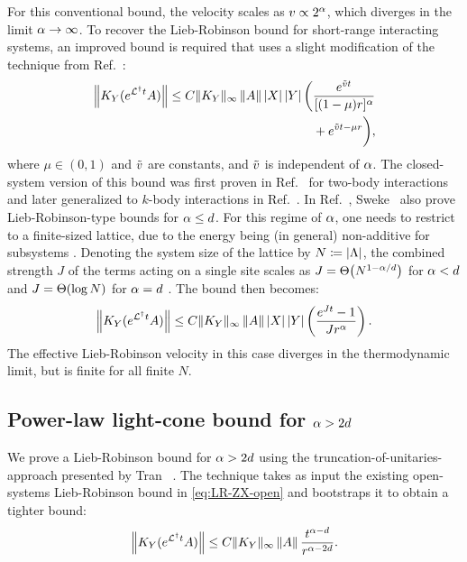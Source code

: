 For this conventional bound, the velocity scales as $v\propto 2^{\alpha} $, which diverges in the limit $\alpha \rightarrow \infty$.
To recover the Lieb-Robinson bound for short-range interacting systems, an improved bound is required that uses a slight modification of the technique from Ref.~\cite{Sweke2019}:
\begin{align}
  \begin{split}
  \left\|  K_Y(e^{\mathcal{L}^\dag t}A)\right\| \leq C \|K_Y\|_{\infty} \left\|A\right\|  \left | X \right|\left | Y \right|
    \biggl(&
    \frac{e^{\tilde vt}}{[(1-\mu)r]^{\alpha}}\\
    &+e^{\tilde vt-\mu r}
    \biggr),
  \end{split}\label{eq:LR-ZX-open}
\end{align}
where $\mu\in (0,1)$ and $\tilde v$ are constants, and $\tilde v$ is independent of $\alpha$.
The closed-system version of this bound was first proven in Ref.~\cite{Gong2014} for two-body interactions and later generalized to $k$-body interactions in Ref.~\cite{Tran2019b}.
In Ref.~\cite{Sweke2019}, Sweke \etal~also prove Lieb-Robinson-type bounds for $\alpha \le d$.
For this regime of $\alpha$, one needs to restrict to a finite-sized lattice, due to the energy being (in general) non-additive for subsystems \cite{Dauxois}.
Denoting the system size of the lattice by $N\coloneqq \left | \Lambda \right|$,
the combined strength $J$ of the terms acting on a single site  scales as $J = \Th{N^{1-\al/d}}$ for $\alpha < d$ and $J = \Th{\log{N}}$ for $\alpha = d$ \cite{bigO,Guo2019}.
The bound then becomes:
\begin{align}
\label{eq:LR-ZX-open-small-alpha}
    \left\|  K_Y(e^{\mathcal{L}^\dag t}A)\right\| \leq C \|K_Y\|_{\infty} \left\|A\right\|  \left | X \right|\left | Y \right|
  \left(
  \frac{e^{J t}-1}{J r^{\alpha}}
  \right).
\end{align}
The effective Lieb-Robinson velocity in this case diverges in the thermodynamic limit, but is finite for all finite $N$.


\subsection{Power-law light-cone bound for $\alpha > 2d$}
\label{sec:power-law-bound}

We prove a Lieb-Robinson bound  for $\alpha >2d$ using the truncation-of-unitaries-approach presented by Tran \etal~\cite{Tran2019b}.
The technique takes as input the existing open-systems Lieb-Robinson bound in \cref{eq:LR-ZX-open} and bootstraps it to obtain a tighter bound:
\begin{align}
  \left\|  K_Y(e^{\mathcal{L}^\dag t}A)\right\|
\leq C \|K_Y\|_{\infty}\left\|A\right\| \frac{t^{\alpha-d}}{r^{\alpha-2d}}.
    \label{eq:LR-Minh-constX}
\end{align}


